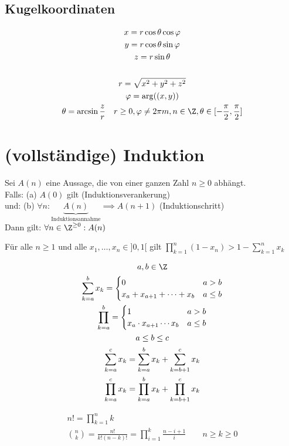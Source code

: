\subsection{Kugelkoordinaten}
\begin{gather*}
	x = r \cos \theta \cos \varphi \\
	y = r \cos \theta \sin \varphi \\
	z = r \sin \theta \\
	\\
	r = \sqrt{x^2 + y^2 + z^2} \\
	\varphi = \arg((x,y)) \\
	\theta = \arcsin \frac{z}{r} \quad r \geq 0 , \varphi \neq 2\pi m , n \in \Z , \theta \in [ -\frac{\pi}{2} , \frac{\pi}{2} ]
\end{gather*}

\section{(vollständige) Induktion}
Sei $A(n)$ eine Aussage, die von einer ganzen Zahl $n \geq 0$ abhängt.\\
Falls: (a) $A(0)$ gilt (Induktionsverankerung) \\
und: (b) $\forall n : \underbrace{A(n)}_{\text{Induktionsannahme}} \implies A(n+1)$ (Induktionschritt) \\
Dann gilt: $\forall n \in \Z^{\geq 0} : A(n)$\\
\begin{satz*}
	Für alle $n \geq 1$ und alle $x_1, \dotsc , x_n \in ]0,1[$ gilt $\prod_{k=1}^n (1-x_n) > 1 - \sum_{k=1}^n x_k$\\
	\begin{bem}[note = Erinnerung:]
		\begin{gather*}
			a, b \in \Z \\
			\sum_{k=a}^b x_k = \begin{cases}
				0						&a > b	\\
				x_a + x_{a+1} + \dots + x_b	&a \leq b	
			\end{cases} \\
			\prod_{k=a}^b = \begin{cases}
				1						&a > b	\\
				x_a \cdot x_{a+1} \dotsm x_b	&a \leq b
			\end{cases}\\
			a \leq b \leq c \\
			\sum_{k=a}^c x_k = \sum_{k=a}^b x_k + \sum_{k=b+1}^c x_k \\
			\prod_{k=a}^c x_k = \prod_{k=a}^b x_k + \prod_{k=b+1}^c x_k
		\end{gather*}
	\end{bem}
	\begin{bsp*}
		\begin{gather*}
			n! = \prod_{k=1}^n k \\
			\binom{n}{k} = \frac{n!}{k!(n-k)!} = \prod_{i=1}^k \frac{n-i+1}{i} \qquad n \geq k \geq 0
		\end{gather*}
	\end{bsp*}
\end{satz*}
